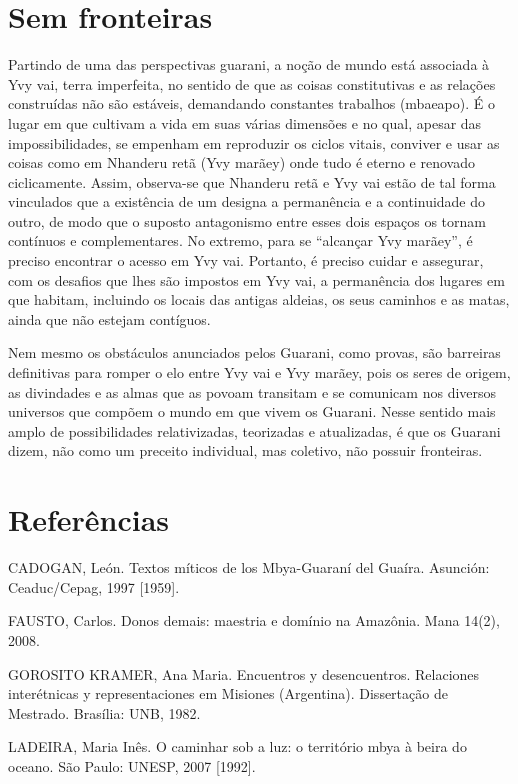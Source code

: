 \section{Sem fronteiras}

Partindo de uma das perspectivas guarani, a noção de mundo está
associada à Yvy vai, terra imperfeita, no sentido de que as coisas
constitutivas e as relações construídas não são estáveis, demandando
constantes trabalhos (mbaeapo). É o lugar em que cultivam a vida em
suas várias dimensões e no qual, apesar das impossibilidades, se
empenham em reproduzir os ciclos vitais, conviver e usar as coisas como
em Nhanderu retã (Yvy marãey) onde tudo é eterno e renovado
ciclicamente. Assim, observa-se que Nhanderu retã e Yvy vai estão de
tal forma vinculados que a existência de um designa a permanência e a
continuidade do outro, de modo que o suposto antagonismo entre esses
dois espaços os tornam contínuos e complementares. No extremo, para se
``alcançar Yvy marãey'', é preciso encontrar o acesso em Yvy vai.
Portanto, é preciso cuidar e assegurar, com os desafios que lhes são
impostos em Yvy vai, a permanência dos lugares em que habitam,
incluindo os locais das antigas aldeias, os seus caminhos e as matas,
ainda que não estejam contíguos. 

Nem mesmo os obstáculos anunciados pelos Guarani, como provas, são
barreiras definitivas para romper o elo entre Yvy vai e Yvy marãey,
pois os seres de origem, as divindades e as almas que as povoam
transitam e se comunicam nos diversos universos que compõem o mundo em
que vivem os Guarani. Nesse sentido mais amplo de possibilidades
relativizadas, teorizadas e atualizadas, é que os Guarani dizem, não
como um preceito individual, mas coletivo, não possuir fronteiras.

\section{Referências}

CADOGAN, León. Textos míticos de los Mbya-Guaraní del Guaíra. Asunción:
Ceaduc/Cepag, 1997 [1959].

FAUSTO, Carlos. Donos demais: maestria e domínio na Amazônia. Mana
14(2), 2008. 

GOROSITO KRAMER, Ana Maria. Encuentros y desencuentros. Relaciones
interétnicas y representaciones em Misiones (Argentina). Dissertação de
Mestrado. Brasília: UNB, 1982.

LADEIRA, Maria Inês.  O caminhar sob a luz: o território mbya à beira do
oceano. São Paulo: UNESP, 2007 [1992].

